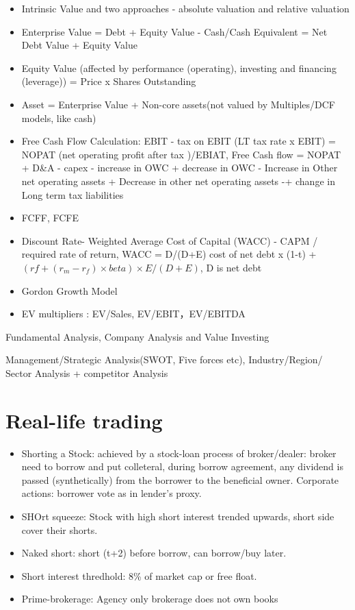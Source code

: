 \documentclass[11pt, openany]{book}              %
\begin{document}
\begin{itemize}
	\item Intrinsic Value and two approaches - absolute valuation and relative valuation 
	\item Enterprise Value = Debt + Equity Value - Cash/Cash Equivalent = Net Debt Value + Equity Value
	\item Equity Value (affected by performance (operating), investing and financing (leverage)) = Price x Shares Outstanding
	\item Asset = Enterprise Value + Non-core assets(not valued by Multiples/DCF models, like cash)
	\item Free Cash Flow Calculation: EBIT - tax on EBIT (LT tax rate x EBIT) = NOPAT (net operating profit after tax )/EBIAT, Free Cash flow = NOPAT + D\&A - capex - increase in OWC + decrease in OWC - Increase in Other net operating assets + Decrease in other net operating assets -+ change in Long term tax liabilities
	\item FCFF, FCFE 
	\item Discount Rate- Weighted Average Cost of Capital (WACC) - CAPM / required rate of return, WACC = D/(D+E) cost of net debt x (1-t) + $(rf+(r_m-r_f)\times beta)\times E/(D+E)$, D is net debt
	\item Gordon Growth Model
	\item EV multipliers : EV/Sales, EV/EBIT，EV/EBITDA
\end{itemize}


Fundamental Analysis, Company Analysis and Value Investing

Management/Strategic Analysis(SWOT, Five forces etc), Industry/Region/ Sector Analysis + competitor Analysis 

\section{ Real-life trading}

\begin{itemize}
    \item Shorting a Stock: achieved by a stock-loan process of broker/dealer: broker need to borrow and put colleteral, during borrow agreement, any dividend is passed (synthetically) from the borrower to the beneficial owner. Corporate actions: borrower vote as in lender's proxy. 
    \item SHOrt squeeze: Stock with high short interest trended upwards, short side cover their shorts.
    \item Naked short: short (t+2) before borrow, can borrow/buy later.
    \item Short interest thredhold: 8\% of market cap or free float.
    \item Prime-brokerage: Agency only brokerage does not own books
\end{itemize}
\end{document}

